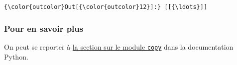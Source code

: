 \begin{Verbatim}[commandchars=\\\{\}]
{\color{outcolor}Out[{\color{outcolor}12}]:} [[{\ldots}]]
\end{Verbatim}
            
    \hypertarget{pour-en-savoir-plus}{%
\subsubsection{Pour en savoir plus}\label{pour-en-savoir-plus}}

    On peut se reporter à
\href{https://docs.python.org/3/library/copy.html}{la section sur le
module \texttt{copy}} dans la documentation Python.


    
    
    
